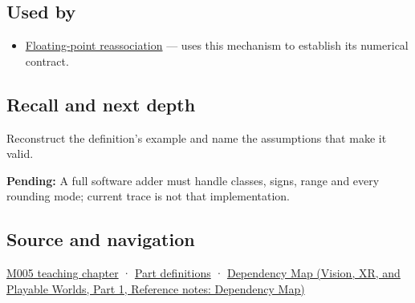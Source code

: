 \subsection{Used by}\label{appendix-a1b1b4580dfd-used-by}

\hypertarget{appendix-a1b1b4580dfd-used-by}{}

\begin{itemize}
\tightlist
\item
  \hyperref[appendix-c2ac4a84c283]{Floating-point reassociation} --- uses this mechanism to establish its numerical contract.
\end{itemize}

\subsection{Recall and next depth}\label{appendix-a1b1b4580dfd-recall-and-next-depth}

\hypertarget{appendix-a1b1b4580dfd-recall-and-next-depth}{}

Reconstruct the definition's example and name the assumptions that make it valid.

\textbf{Pending:} A full software adder must handle classes, signs, range and every rounding mode; current trace is not that implementation.

\subsection{Source and navigation}\label{appendix-a1b1b4580dfd-source-and-navigation}

\hypertarget{appendix-a1b1b4580dfd-source-and-navigation}{}

\hyperref[01-foundations-i-ch001-when-arithmetic-meets-uncertainty]{M005 teaching chapter} · \hyperref[appendix-fd090d982a15-m005---parts-77-88]{Part definitions} · \href{../07-Vision-XR-and-Playable-Worlds-P01/main.pdf\#appendix-4ad47bdd269a}{Dependency Map (Vision, XR, and Playable Worlds, Part 1, Reference notes: Dependency Map)}
